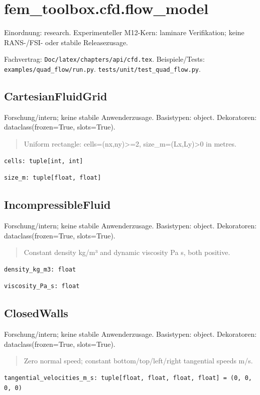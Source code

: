 \section{fem\_toolbox.cfd.flow\_model}
Einordnung: research. Experimenteller M12-Kern: laminare Verifikation; keine RANS-/FSI- oder stabile Releasezusage.
\par Fachvertrag: \nolinkurl{Doc/latex/chapters/api/cfd.tex}. Beispiele/Tests:
\nolinkurl{examples/quad_flow/run.py}.
\nolinkurl{tests/unit/test_quad_flow.py}.
\subsection{CartesianFluidGrid}
Forschung/intern; keine stabile Anwenderzusage.
Basistypen: object. Dekoratoren: dataclass(frozen=True, slots=True).
\begin{quote}
Uniform rectangle: cells=(nx,ny)>=2, size\_m=(Lx,Ly)>0 in metres.
\end{quote}
\begin{lstlisting}
cells: tuple[int, int]
\end{lstlisting}
\begin{lstlisting}
size_m: tuple[float, float]
\end{lstlisting}
\subsection{IncompressibleFluid}
Forschung/intern; keine stabile Anwenderzusage.
Basistypen: object. Dekoratoren: dataclass(frozen=True, slots=True).
\begin{quote}
Constant density kg/m³ and dynamic viscosity Pa s, both positive.
\end{quote}
\begin{lstlisting}
density_kg_m3: float
\end{lstlisting}
\begin{lstlisting}
viscosity_Pa_s: float
\end{lstlisting}
\subsection{ClosedWalls}
Forschung/intern; keine stabile Anwenderzusage.
Basistypen: object. Dekoratoren: dataclass(frozen=True, slots=True).
\begin{quote}
Zero normal speed; constant bottom/top/left/right tangential speeds m/s.
\end{quote}
\begin{lstlisting}
tangential_velocities_m_s: tuple[float, float, float, float] = (0, 0, 0, 0)
\end{lstlisting}
